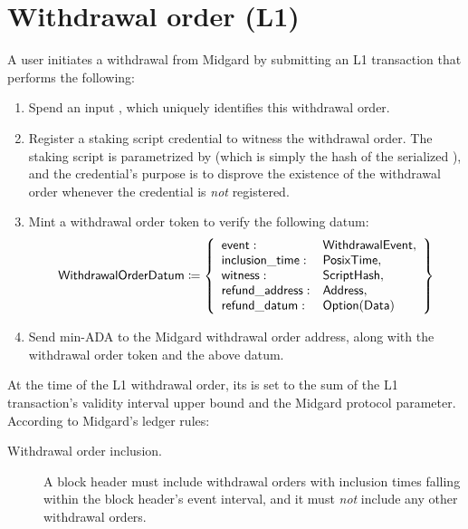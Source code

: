 \documentclass[../midgard.tex]{subfiles}
\begin{document}
\section{Withdrawal order (L1)}
\label{h:withdrawal-order}


A user initiates a withdrawal from Midgard by submitting an L1 transaction that performs the following:
\begin{enumerate}
    \item Spend an input , which uniquely identifies this withdrawal order.
    \item Register a staking script credential to witness the withdrawal order.
      The staking script is parametrized by  (which is simply the hash of the serialized ), and the credential's purpose is to disprove the existence of the withdrawal order whenever the credential is \emph{not} registered.
    \item Mint a withdrawal order token to verify the following datum:
        \begin{equation*}
        \mathsf{WithdrawalOrderDatum} \coloneq \left\{
            \begin{array}{ll}
                \mathsf{event} : & \mathsf{WithdrawalEvent}, \\
                \mathsf{inclusion\_time} : & \mathsf{PosixTime}, \\
                \mathsf{witness} : & \mathsf{ScriptHash}, \\
                \mathsf{refund\_address}: & \mathsf{Address}, \\
                \mathsf{refund\_datum}: & \mathsf{Option(Data)}
            \end{array}
            \right\}
        \end{equation*}
    \item Send min-ADA to the Midgard withdrawal order address, along with the withdrawal order token and the above datum.
\end{enumerate}

At the time of the L1 withdrawal order, its  is set to the sum of the L1 transaction's validity interval upper bound and the  Midgard protocol parameter.
According to Midgard's ledger rules:
\begin{description}
    \item[Withdrawal order inclusion.] A block header must include withdrawal orders with inclusion times falling within the block header's event interval, and it must \emph{not} include any other withdrawal orders.
\end{description}
\end{document}
